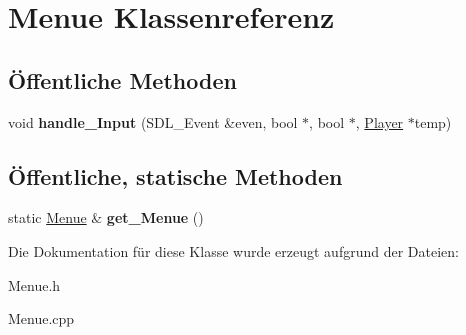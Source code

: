 \hypertarget{class_menue}{\section{Menue Klassenreferenz}
\label{class_menue}
}
\subsection*{Öffentliche Methoden}
\begin{DoxyCompactItemize}
\item 
\hypertarget{class_menue_adab670791d2a103a26626b700698376d}{void {\bfseries handle\-\_\-\-Input} (S\-D\-L\-\_\-\-Event \&even, bool $\ast$, bool $\ast$, \hyperlink{class_player}{Player} $\ast$temp)}\label{class_menue_adab670791d2a103a26626b700698376d}

\end{DoxyCompactItemize}
\subsection*{Öffentliche, statische Methoden}
\begin{DoxyCompactItemize}
\item 
\hypertarget{class_menue_a91bc6d5c4bb7214cd818223cdde9ef88}{static \hyperlink{class_menue}{Menue} \& {\bfseries get\-\_\-\-Menue} ()}\label{class_menue_a91bc6d5c4bb7214cd818223cdde9ef88}

\end{DoxyCompactItemize}


Die Dokumentation für diese Klasse wurde erzeugt aufgrund der Dateien\-:\begin{DoxyCompactItemize}
\item 
Menue.\-h\item 
Menue.\-cpp\end{DoxyCompactItemize}
